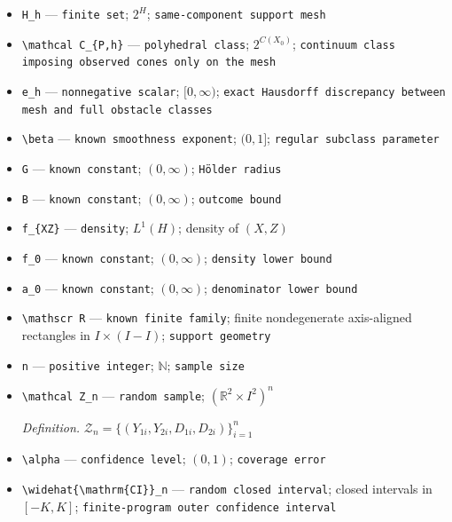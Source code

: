 \documentclass{article}
\begin{document}
\begin{itemize}
  \item \texttt{H\_\allowbreak{}h} --- \texttt{finite set}; \(2^H\); \texttt{same-\allowbreak{}component support mesh}
  \item \texttt{\textbackslash{}\allowbreak{}mathcal C\_\allowbreak{}\{P,\allowbreak{}h\}\allowbreak{}} --- \texttt{polyhedral class}; \(2^{C(X_0)}\); \texttt{continuum class imposing observed cones only on the mesh}
  \item \texttt{e\_\allowbreak{}h} --- \texttt{nonnegative scalar}; \([0,\infty)\); \texttt{exact Hausdorff discrepancy between mesh and full obstacle classes}
  \item \texttt{\textbackslash{}\allowbreak{}beta} --- \texttt{known smoothness exponent}; \((0,1]\); \texttt{regular subclass parameter}
  \item \texttt{G} --- \texttt{known constant}; \((0,\infty)\); \texttt{Hölder radius}
  \item \texttt{B} --- \texttt{known constant}; \((0,\infty)\); \texttt{outcome bound}
  \item \texttt{f\_\allowbreak{}\{XZ\}\allowbreak{}} --- \texttt{density}; \(L^1(H)\); density of \((X,Z)\)
  \item \texttt{f\_\allowbreak{}0} --- \texttt{known constant}; \((0,\infty)\); \texttt{density lower bound}
  \item \texttt{a\_\allowbreak{}0} --- \texttt{known constant}; \((0,\infty)\); \texttt{denominator lower bound}
  \item \texttt{\textbackslash{}\allowbreak{}mathscr R} --- \texttt{known finite family}; finite nondegenerate axis-aligned rectangles in \(I\times(I-I)\); \texttt{support geometry}
  \item \texttt{n} --- \texttt{positive integer}; \(\mathbb N\); \texttt{sample size}
  \item \texttt{\textbackslash{}\allowbreak{}mathcal Z\_\allowbreak{}n} --- \texttt{random sample}; \((\mathbb R^2\times I^2)^n\)
  \par\smallskip\noindent\emph{Definition.} \(\mathcal Z_n=\{(Y_{1i},Y_{2i},D_{1i},D_{2i})\}_{i=1}^n\)
  \item \texttt{\textbackslash{}\allowbreak{}alpha} --- \texttt{confidence level}; \((0,1)\); \texttt{coverage error}
  \item \texttt{\textbackslash{}\allowbreak{}widehat\{\textbackslash{}\allowbreak{}mathrm\{CI\}\allowbreak{}\}\allowbreak{}\_\allowbreak{}n} --- \texttt{random closed interval}; closed intervals in \([-K,K]\); \texttt{finite-\allowbreak{}program outer confidence interval}

\end{itemize}
\end{document}
